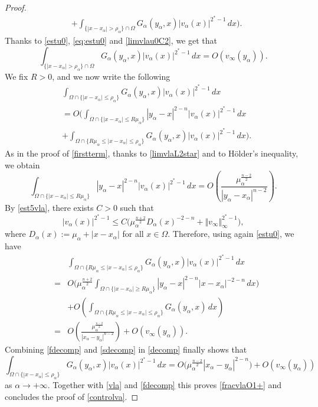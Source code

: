 \documentclass[10pt]{amsart}
\numberwithin{equation}{section}
\newcommand{\Om}{\Omega}
\newcommand{\ma}{\mu_\alpha}
\def \vv {\mathbb{\Vert}}
\def \xl{x_\alpha}
\def\la{\alpha}
\def \ma{\mu_{\alpha}}
\def \yl{y_{\alpha}}
\def \vo {v_{\infty}}
\def \ro{\rho}
\theoremstyle{plain}
\theoremstyle{remark}
\begin{document}
\begin{proof}
\begin{equation}
\begin{aligned}
&+ \int_{\{|x-\xl|> \ro_\la\}\cap\Om} G_{\la}(\yl,x)|v_{\la}(x)|^{2^*-1}\, dx \Bigg) .
\end{aligned}
\end{equation}
Thanks to \eqref{estu0}, \eqref{eq:estu0} and \eqref{limvlau0C2}, we get that 
\begin{equation} \label{vla}
  \int_{\{|x-\xl|> \ro_\la\}\cap\Om} G_{\la}(\yl,x)|v_{\la}(x)|^{2^*-1}\, dx  =O\left( \vo(\yl)\right). 
  \end{equation}
 We fix $R>0$, and we now write the following
\begin{equation} \label{decomp}
\begin{aligned}
&	\int_{\Om\cap \{|x-\xl|\leq \ro_{\la}\}}G_\la(\yl,x)\big|v_{\la}(x)\big|^{2^*-1}\, dx \\
&=O\Bigg( \int_{\Om\cap  \{|x-\xl|\leq R\ma\}}|\yl-x|^{2-n}\big|v_{\la}(x)\big|^{2^*-1}\, dx \\
	& + \int_{\Om\cap \{R \ma \le |x-\xl|\leq \ro_{\la}\}}G_\la(\yl,x)\big|v_{\la}(x)\big|^{2^*-1}\, dx \Bigg).
\end{aligned}
\end{equation}
As in the proof of \eqref{firstterm}, thanks to \eqref{limvlaL2star} and to H\"older's inequality, we obtain 
\begin{equation}\label{fdecomp}
\int_{\Om\cap \{|x-\xl|\leq R\ma\}}|\yl-x|^{2-n} \big|v_{\la}(x)\big|^{2^*-1}\, dx	=O\left( \frac{\ma^{\frac{n-2}{2}}}{|\yl-\xl|^{n-2}}\right).
\end{equation}
\noindent By \eqref{est5vla}, there exists $C>0$ such that 
\begin{equation*} 
	\big|v_{\la}(x)\big|^{2^*-1}\leq C\Big( \ma^{\frac{n+2}{2}}D_{\la}(x)^{-2-n}+\vv \vo \vv_{\infty}^{2^*-1} \Big),
\end{equation*}
where $D_{\la}(x):=\ma +|x-\xl|$  for all $x\in \Om$. Therefore, using again \eqref{estu0}, we have
\begin{eqnarray}\label{sdecomp}
	&&\int_{\Om\cap \{R \ma \le |x-\xl|\leq \ro_{\la}\}}G_\la(\yl,x)\big|v_{\la}(x)\big|^{2^*-1}\, dx\nonumber\\
	&=&O\Big(\ma^{\frac{n+2}{2}}\int_{\Om \cap \{|x-\xl|\geq R \ma\}  }|\yl-x|^{2-n}|x-\xl|^{-2-n}\, dx \Big)\nonumber\\
	&&+O\left(\int_{\Om\cap \{R \ma \le |x-\xl|\leq \ro_{\la}\}} G_\la(\yl,x)\, dx \right)\nonumber \\
	&=&O\left( \frac{\ma^{\frac{n-2}{2}}}{|x_\alpha - y_\alpha|^{n-2}}\right)  + O(\vo(\yl)).
\end{eqnarray}
Combining \eqref{fdecomp} and \eqref{sdecomp} in \eqref{decomp} finally shows that 
\begin{equation*} 
	\int_{\Om\cap \{|x-\xl|\leq \ro_{\la}\}}G_\la(\yl,x)\big|v_{\la}(x)\big|^{2^*-1}\, dx=O\Big(\ma^{\frac{n-2}{2}}|x_\alpha - y_\alpha|^{2-n} \Big)+ O(\vo(\yl))
\end{equation*}
as $\alpha \to + \infty$. Together with \eqref{vla} and \eqref{fdecomp} this proves \eqref{fracvlaO1+} and concludes the proof of \eqref{controlva}. 
 \end{proof}
\end{document}
